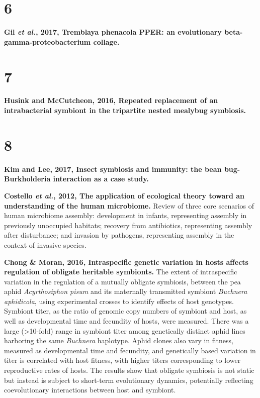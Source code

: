 \documentclass[11pt]{article}
\begin{document}
\begin{sloppypar}
\section*{6}
\textbf{Gil \textit{et al.}, 2017, Tremblaya phenacola PPER: an evolutionary beta-gamma-proteobacterium collage.}

\section*{7}
\textbf{Husink and McCutcheon, 2016, Repeated replacement of an intrabacterial symbiont in the tripartite nested mealybug symbiosis.}

\section*{8}
\textbf{Kim and Lee, 2017, Insect symbiosis and immunity: the bean bug-Burkholderia interaction as a case study.}

\par

\textbf{Costello \textit{et al.}, 2012, The application of ecological theory toward an understanding of the human microbiome.} \newline
Review of three core scenarios of human microbiome assembly: 
development in infants, representing assembly in previously unoccupied habitats; 
recovery from antibiotics, representing assembly after disturbance; 
and invasion by pathogens, representing assembly in the context of invasive species. 

\par

\textbf{Chong & Moran, 2016, Intraspecific genetic variation in hosts affects regulation of obligate heritable symbionts.} \newline
The extent of intraspecific variation in the regulation of a mutually obligate symbiosis, between the pea aphid \textit{Acyrthosiphon pisum} and its maternally transmitted symbiont \textit{Buchnera aphidicola}, using experimental crosses to identify effects of host genotypes. 
Symbiont titer, as the ratio of genomic copy numbers of symbiont and host, as well as developmental time and fecundity of hosts, were measured. 
There was a large (>10-fold) range in symbiont titer among genetically distinct aphid lines harboring the same \textit{Buchnera} haplotype. 
Aphid clones also vary in fitness, measured as developmental time and fecundity, and genetically based variation in titer is correlated with host fitness, with higher titers corresponding to lower reproductive rates of hosts. 
The results show that obligate symbiosis is not static but instead is subject to short-term evolutionary dynamics, potentially reflecting coevolutionary interactions between host and symbiont.


\end{sloppypar}
\end{document}
